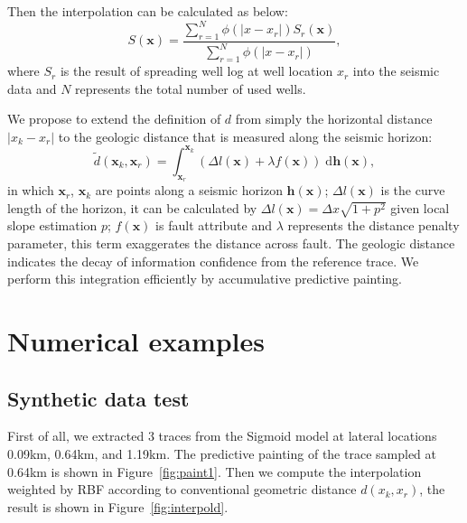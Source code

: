 Then the interpolation can be calculated as below:
\begin{equation}
    S(\mathbf{x}) = \frac{\sum_{r=1}^N
        \phi(\vert x-x_r\vert)S_r(\mathbf{x})}
        {\sum_{r=1}^N \phi(\vert x-x_r\vert)},
\end{equation}
where $S_r$ is the result of spreading well log at well location $x_r$ into the seismic data and $N$ represents the total number of used wells.

We propose to extend the definition of $d$ from simply the horizontal distance $\vert x_k-x_r\vert$ to the geologic distance that is measured along the seismic horizon:
\begin{equation}
    \tilde d(\mathbf{x}_k,\mathbf{x}_r) =
        \int_{\mathbf{x}_r}^{\mathbf{x}_k} \left(
        \Delta l(\mathbf{x}) + \lambda f(\mathbf{x})
        \right)\;\mathrm{d}\mathbf{h}(\mathbf{x}),
\end{equation}
in which $\mathbf{x}_r$, $\mathbf{x}_k$ are points along a seismic horizon $\mathbf{h}(\mathbf{x})$; $\Delta l(\mathbf{x})$ is the curve length of the horizon, it can be calculated by $\Delta l(\mathbf{x}) = \Delta x\sqrt{1+p^2}$ given local slope estimation $p$; $f(\mathbf{x})$ is fault attribute and $\lambda$ represents the distance penalty parameter, this term exaggerates the distance across fault.
The geologic distance indicates the decay of information confidence from the reference trace.
We perform this integration efficiently by accumulative predictive painting.


\section{Numerical examples}
\subsection{Synthetic data test}
First of all, we extracted 3 traces from the Sigmoid model at lateral locations 0.09km, 0.64km, and 1.19km.
The predictive painting of the trace sampled at 0.64km is shown in Figure~\ref{fig:paint1}.
Then we compute the interpolation weighted by RBF according to conventional geometric distance $d(x_k,x_r)$, the result is shown in Figure~\ref{fig:interpold}.


